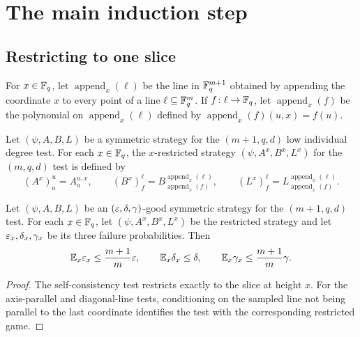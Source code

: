 \chapter{The main induction step}
\label{chap:induction}
\label{sec:induction}

\section{Restricting to one slice}

\begin{definition}\label{def:append-x}
	\leanok
  For $x \in \mathbb{F}_q$, let $\operatorname{append}_x(\ell)$ be the line in $\mathbb{F}_q^{m+1}$ obtained by appending the coordinate $x$ to every point of a line $\ell \subseteq \mathbb{F}_q^m$. If $f \colon \ell \to \mathbb{F}_q$, let $\operatorname{append}_x(f)$ be the polynomial on $\operatorname{append}_x(\ell)$ defined by $\operatorname{append}_x(f)(u,x)=f(u)$.
\end{definition}

\begin{definition}\label{def:restricted-strategy}
	\leanok
  Let $(\psi,A,B,L)$ be a symmetric strategy for the $(m+1,q,d)$ low individual degree test. For each $x \in \mathbb{F}_q$, the $x$-restricted strategy $(\psi,A^x,B^x,L^x)$ for the $(m,q,d)$ test is defined by
  \[
    (A^x)_a^u = A_a^{u,x},
    \qquad
    (B^x)_f^\ell = B_{\operatorname{append}_x(f)}^{\operatorname{append}_x(\ell)},
    \qquad
    (L^x)_f^\ell = L_{\operatorname{append}_x(f)}^{\operatorname{append}_x(\ell)}.
  \]
\end{definition}

\begin{lemma}\label{lem:restricted-probabilities}
	\leanok
  Let $(\psi,A,B,L)$ be an $(\varepsilon,\delta,\gamma)$-good symmetric strategy for the $(m+1,q,d)$ test. For each $x \in \mathbb{F}_q$, let $(\psi,A^x,B^x,L^x)$ be the restricted strategy and let $\varepsilon_x,\delta_x,\gamma_x$ be its three failure probabilities. Then
  \[
    \mathbb{E}_x \varepsilon_x \le \frac{m+1}{m}\varepsilon,
    \qquad
    \mathbb{E}_x \delta_x \le \delta,
    \qquad
    \mathbb{E}_x \gamma_x \le \frac{m+1}{m}\gamma.
  \]
\end{lemma}
\begin{proof}
	\leanok
	The self-consistency test restricts exactly to the slice at height $x$. For the axis-parallel and diagonal-line tests, conditioning on the sampled line not being parallel to the last coordinate identifies the test with the corresponding restricted game.
\end{proof}


